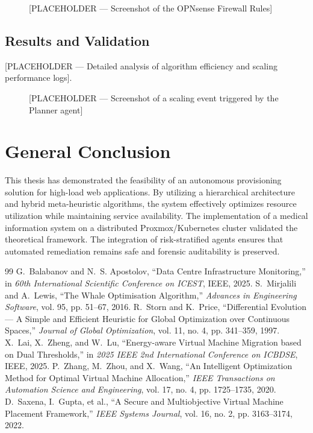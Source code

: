 \documentclass[12pt,a4paper]{report}
\begin{document}
\begin{figure}[htbp]
\centering
\fbox{\rule{0pt}{5cm}\rule{0.9\linewidth}{0pt}}
\caption{[PLACEHOLDER — Screenshot of the OPNsense Firewall Rules]}
\label{fig:firewall_config}
\end{figure}

\section{Results and Validation}

[PLACEHOLDER — Detailed analysis of algorithm efficiency and scaling performance logs].

\begin{figure}[htbp]
\centering
\fbox{\rule{0pt}{5cm}\rule{0.9\linewidth}{0pt}}
\caption{[PLACEHOLDER — Screenshot of a scaling event triggered by the Planner agent]}
\label{fig:scaling_log}
\end{figure}

\chapter*{General Conclusion}

This thesis has demonstrated the feasibility of an autonomous provisioning solution for high-load web applications. By utilizing a hierarchical architecture and hybrid meta-heuristic algorithms, the system effectively optimizes resource utilization while maintaining service availability. The implementation of a medical information system on a distributed Proxmox/Kubernetes cluster validated the theoretical framework. The integration of risk-stratified agents ensures that automated remediation remains safe and forensic auditability is preserved.

\begin{thebibliography}{99}
G.~Balabanov and N.~S. Apostolov, ``Data Centre Infrastructure Monitoring,'' in \textit{60th International Scientific Conference on ICEST}, IEEE, 2025.
S.~Mirjalili and A.~Lewis, ``The Whale Optimisation Algorithm,'' \textit{Advances in Engineering Software}, vol. 95, pp. 51--67, 2016.
R.~Storn and K.~Price, ``Differential Evolution --- A Simple and Efficient Heuristic for Global Optimization over Continuous Spaces,'' \textit{Journal of Global Optimization}, vol. 11, no. 4, pp. 341--359, 1997.
X.~Lai, X.~Zheng, and W.~Lu, ``Energy-aware Virtual Machine Migration based on Dual Thresholds,'' in \textit{2025 IEEE 2nd International Conference on ICBDSE}, IEEE, 2025.
P.~Zhang, M.~Zhou, and X.~Wang, ``An Intelligent Optimization Method for Optimal Virtual Machine Allocation,'' \textit{IEEE Transactions on Automation Science and Engineering}, vol. 17, no. 4, pp. 1725--1735, 2020.
D.~Saxena, I.~Gupta, et al., ``A Secure and Multiobjective Virtual Machine Placement Framework,'' \textit{IEEE Systems Journal}, vol. 16, no. 2, pp. 3163--3174, 2022.
\end{thebibliography}
\end{document}
